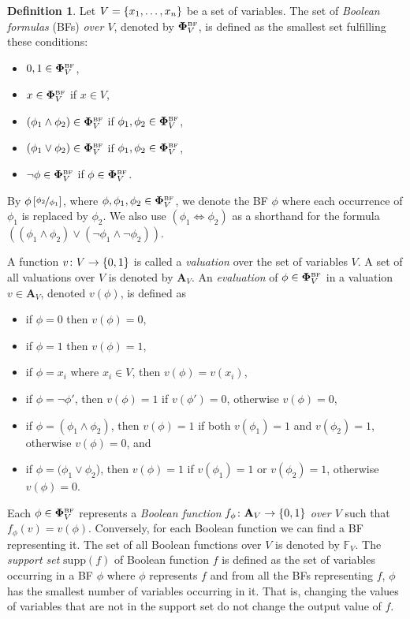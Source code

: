 \documentclass[
  digital, %
  twoside, %
  table,   %
  nolof,     %
  nolot,     %
]{fithesis3}
\let\setbuilder\set
\newcommand{\simpleset}[1]{\{{#1}\}}
\renewcommand{\set}[1]{\normalexpandarg\IfSubStr{#1}{|}{\setbuilder{#1}}{\simpleset{#1}}}
\theoremstyle{definition}
\newtheorem{definition}{Definition}
\theoremstyle{remark}
\newcommand{\substitute}[2]{\left[ \nicefrac{#2}{#1} \right]}
\newcommand{\BF}[1]{\mathbf{\Phi}_{#1}^{\normalfont{\text{\tiny BF}}}}
\newcommand{\valtns}[1]{\mathbf{A}_{#1}}
\newcommand{\BFuncs}[1]{\mathbb{F}_{#1}}
\newcommand{\supp}[1]{\mathrm{supp}(#1)}
\newcommand{\lequal}{\Leftrightarrow}
\begin{document}
\begin{definition}
Let $V = \set{x_1, \dots, x_n}$ be a set of variables. The set of \emph{Boolean formulas} (BFs) \emph{over $V$}, denoted by $\BF{V}$, is defined as the smallest set fulfilling these conditions:
\begin{itemize}
    \item $0,1 \in \BF{V}$,
    \item $x \in \BF{V}$ if $x \in V$,
    \item $(\phi_1 \land \phi_2) \in \BF{V}$ if $\phi_1, \phi_2 \in \BF{V}$,
    \item $(\phi_1 \lor \phi_2) \in \BF{V}$ if $\phi_1, \phi_2 \in \BF{V}$,
    \item $\neg\phi \in \BF{V}$ if $\phi \in \BF{V}$.
\end{itemize}
\end{definition}
By $\phi\substitute{\phi_1}{\phi_2}$, where $\phi,\phi_1,\phi_2 \in \BF{V}$, we denote the BF $\phi$ where each occurrence of $\phi_1$ is replaced by $\phi_2$. We also use $(\phi_1 \lequal \phi_2)$ as a shorthand for the formula $((\phi_1 \land \phi_2) \lor (\neg \phi_1 \land \neg \phi_2))$.

A function $v\colon V \to \set{0,1}$ is called a \emph{valuation} over the set of variables $V$. A set of all valuations over $V$ is denoted by $\valtns{V}$. An \emph{evaluation} of $\phi \in \BF{V}$ in a valuation $v \in \valtns{V}$, denoted $v(\phi)$, is defined as %
\begin{itemize}
    \item if $\phi = 0$ then $v(\phi) = 0$,
    \item if $\phi = 1$ then $v(\phi) = 1$,
    \item if $\phi = x_i$ where $x_i \in V$, then $v(\phi) = v(x_i)$,
    \item if $\phi = \neg\phi'$, then $v(\phi) = 1$ if $v(\phi') = 0$, otherwise $v(\phi) = 0$,
    \item if $\phi = (\phi_1 \land \phi_2)$, then $v(\phi) = 1$ if both $v(\phi_1) = 1$ and $v(\phi_2) = 1$, otherwise $v(\phi) = 0$, and
    \item if $\phi = (\phi_1 \lor \phi_2$), then $v(\phi) = 1$ if $v(\phi_1) = 1$ or $v(\phi_2) = 1$, otherwise $v(\phi) = 0$.
\end{itemize}
Each $\phi \in \BF{V}$ represents a \emph{Boolean function} $f_{\phi}\colon \valtns{V} \to \set{0,1}$ \emph{over $V$} such that $f_{\phi}(v) = v(\phi)$. Conversely, for each Boolean function we can find a BF representing it. The set of all Boolean functions over $V$ is denoted by $\BFuncs{V}$. The \emph{support set} $\supp{f}$ of Boolean function $f$ is defined as the set of variables occurring in a BF $\phi$ where $\phi$ represents $f$ and from all the BFs representing $f$, $\phi$ has the smallest number of variables occurring in it. That is, changing the values of variables that are not in the support set do not change the output value of $f$.
\end{document}
